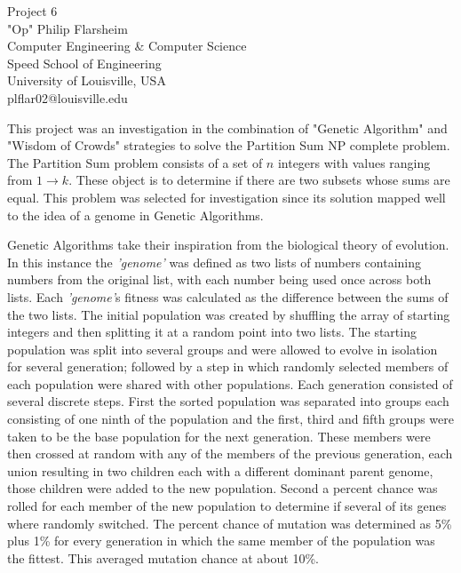 \documentclass{article}
\begin{document}
\begin{raggedleft}
Project 6\\
"Op" Philip Flarsheim\\
Computer Engineering \& Computer Science\\
Speed School of Engineering\\
University of Louisville, USA\\
plflar02@louisville.edu\\
\end{raggedleft}


This project was an investigation in the combination of "Genetic Algorithm" and "Wisdom of Crowds" strategies to solve the Partition Sum NP complete problem. The Partition Sum problem consists of a set of $n$ integers with values ranging from $1 \to k$. These object is to determine if there are two subsets whose sums are equal. This problem was selected for investigation since its solution mapped well to the idea of a genome in Genetic Algorithms.\\


Genetic Algorithms take their inspiration from the biological theory of evolution. In this instance the \emph{'genome'} was defined as two lists of numbers containing numbers from the original list, with each number being used once across both lists. Each \emph{'genome'}s fitness was calculated as the difference between the sums of the two lists. The initial population was created by shuffling the array of starting integers and then splitting it at a random point into two lists. The starting population was split into several groups and were allowed to evolve in isolation for several generation; followed by a step in which randomly selected members of each population were shared with other populations. Each generation consisted of several discrete steps. First the sorted population was separated into groups each consisting of one ninth of the population and the first, third and fifth groups were taken to be the base population for the next generation. These members were then crossed at random with any of the members of the previous generation, each union resulting in two children each with a different dominant parent genome, those children were added to the new population. Second a percent chance was rolled for each member of the new population to determine if several of its genes where randomly switched. The percent chance of mutation was determined as 5\% plus 1\% for every generation in which the same member of the population was the fittest. This averaged mutation chance at about 10\%.
\end{document}
